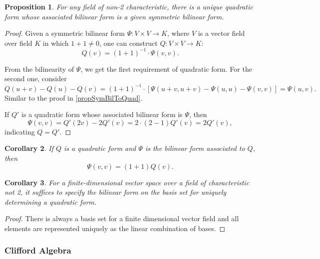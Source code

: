 \documentclass[12pt, letterpaper]{article}
\newtheorem{prop}{Proposition}[section]
\newtheorem{cor}[prop]{Corollary}
\theoremstyle{definition}
\theoremstyle{remark}
\theoremstyle{definition}
\theoremstyle{plain}
\numberwithin{equation}{section}
\begin{document}
	\begin{prop}
		For any field of non-2 characteristic,
		there is a unique quadratic form whose associated bilinear form is a given symmetric bilinear form.
	\end{prop}
	\begin{proof}
		Given a symmetric bilinear form $\Psi\colon V\times V\to K$,
		where $V$ is a vector field over field $K$ in which $1+1\ne0$,
		one can construct $Q\colon V\times V\to K$:
		\[
		Q(v)=(1+1)^{-1}\cdot \Psi(v,v).
		\]
		
		From the bilinearity of $\Psi$, we get the first requirement of quadratic form.
		For the second one, consider
		\[
		Q(u+v)-Q(u)-Q(v)=(1+1)^{-1}\cdot [\Psi(u+v,u+v)-\Psi(u,u)-\Psi(v,v)]=\Psi(u,v).
		\]
		Similar to the proof in \ref{propSymBilToQuad}.
		
		If $Q'$ is a quadratic form whose associated bilinear form is $\Psi$,
		then
		\[\Psi(v,v)=Q'(2v)-2Q'(v)=2\cdot(2-1)Q'(v)=2Q'(v),\]
		indicating $Q=Q'$.
	\end{proof}
	\begin{cor}
		If $Q$ is a quadratic form and $\Psi$ is the bilinear form associated to $Q$,
		then
		\[\Psi(v,v)=(1+1)Q(v).\]
	\end{cor}
	\begin{cor}
		For a finite-dimensional vector space over a field of characteristic not 2,
		it suffices to specify the bilinear form on the basis set for uniquely determining
		a quadratic form.
	\end{cor}
	\begin{proof}
		There is always a basis set for a finite dimensional vector field and all elements are
		represented uniquely as the linear combination of bases.
	\end{proof}

	\subsubsection{Clifford Algebra}
\end{document}

